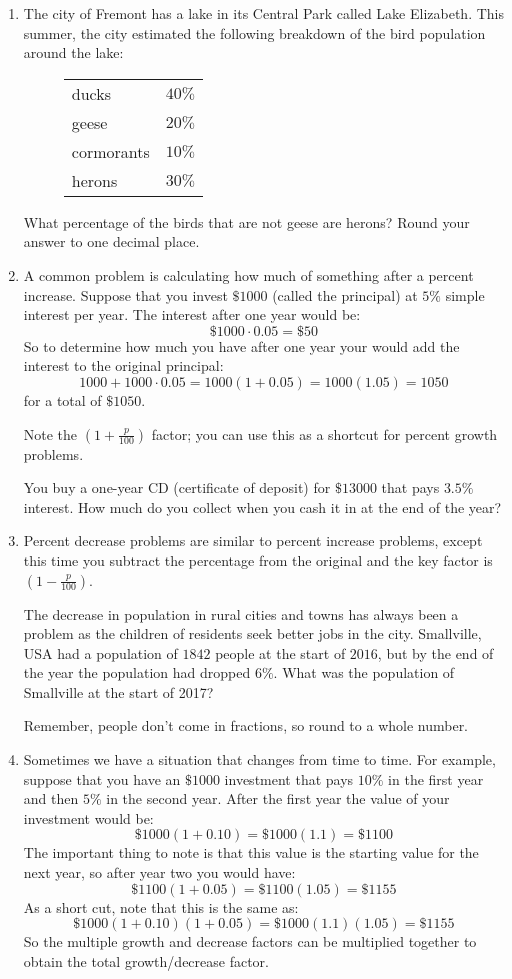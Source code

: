 \documentclass[letterpaper,12pt,fleqn]{article}
\begin{document}
\begin{enumerate}
\item The city of Fremont has a lake in its Central Park called Lake Elizabeth.
  This summer, the city estimated the following breakdown of the bird
  population around the lake:

  \begin{figure}[h]
    \setlength{\leftskip}{1in}
    \begin{tabular}{lc}
      ducks & $40\%$ \\
      geese & $20\%$ \\
      cormorants & $10\%$ \\
      herons & $30\%$
    \end{tabular}
  \end{figure}
  
  What percentage of the birds that are not geese are herons? Round your answer
  to one decimal place.

\item A common problem is calculating how much of something after a percent
  increase. Suppose that you invest $\$1000$ (called the principal) at $5\%$
  simple interest per year. The interest after one year would be:
  \[\$1000\cdot0.05=\$50\]
  So to determine how much you have after one year your would add the interest
  to the original principal:
  \[1000+1000\cdot0.05=1000(1+0.05)=1000(1.05)=1050\]
  for a total of $\$1050$.

  Note the $\left(1+\frac{p}{100}\right)$ factor; you can use this as a
  shortcut for percent growth problems.

  You buy a one-year CD (certificate of deposit) for $\$13000$ that pays
  $3.5\%$ interest. How much do you collect when you cash it in at the
  end of the year?

\item Percent decrease problems are similar to percent increase problems,
  except this time you subtract the percentage from the original and the key
  factor is $\left(1−\frac{p}{100}\right)$.

  The decrease in population in rural cities and towns has always been a
  problem as the children of residents seek better jobs in the city.
  Smallville, USA had a population of $1842$ people at the start of $2016$, but
  by the end of the year the population had dropped $6\%$. What was the
  population of Smallville at the start of 2017?

  Remember, people don't come in fractions, so round to a whole number.

\item Sometimes we have a situation that changes from time to time. For
  example, suppose that you have an $\$1000$ investment that pays $10\%$ in
  the first year and then $5\%$ in the second year. After the first year the
  value of your investment would be:
  \[\$1000(1+0.10)=\$1000(1.1)=\$1100\]
  The important thing to note is that this value is the starting value for the
  next year, so after year two you would have:
  \[\$1100(1+0.05)=\$1100(1.05)=\$1155\]
  As a short cut, note that this is the same as:
  \[\$1000(1+0.10)(1+0.05)=\$1000(1.1)(1.05)=\$1155\]
  So the multiple growth and decrease factors can be multiplied together to
  obtain the total growth/decrease factor.


\end{enumerate}
\end{document}
